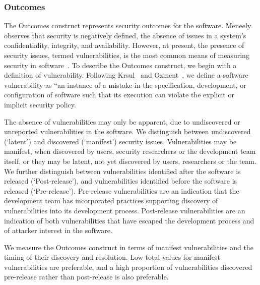 \subsubsection{Outcomes}
\label{sec:model_contruct_outcome}
The Outcomes construct represents security outcomes for the software. Meneely~\cite{meneely2016security} observes that security is negatively defined, the absence of issues in a system's confidentiality, integrity, and availability. 
However, at present, the presence of security issues, termed vulnerabilities, is the most common means of measuring security in software~\cite{morrison2014mapping}.
To describe the Outcomes construct, we begin with a definition of vulnerability. Following Krsul~\cite{krsul1998software} and Ozment~\cite{ozment2007vulnerability}, we define a software vulnerability as “an instance of a mistake in the specification, development, or configuration of software such that its execution can violate the explicit or implicit security policy. 

The absence of vulnerabilities may only be apparent, due to undiscovered or unreported vulnerabilities in the software. We distinguish between undiscovered (`latent') and discovered (`manifest') security issues.  Vulnerabilities may be manifest, when discovered by users, security researchers or the development team itself, or they may be latent, not yet discovered by users, researchers or the team. We further distinguish between vulnerabilities identified after the software is released (`Post-release'), and vulnerabilities identified before the software is released (`Pre-release'). Pre-release vulnerabilities are an indication that the development team has incorporated practices supporting discovery of vulnerabilities into its development process. Post-release vulnerabilities are an indication of both vulnerabilities that have escaped the development process and of attacker interest in the software. 

We measure the Outcomes construct in terms of manifest vulnerabilities and the  timing of their discovery and resolution. Low total values for manifest vulnerabilities are preferable, and a high proportion of vulnerabilities discovered pre-release rather than post-release is also preferable. 

